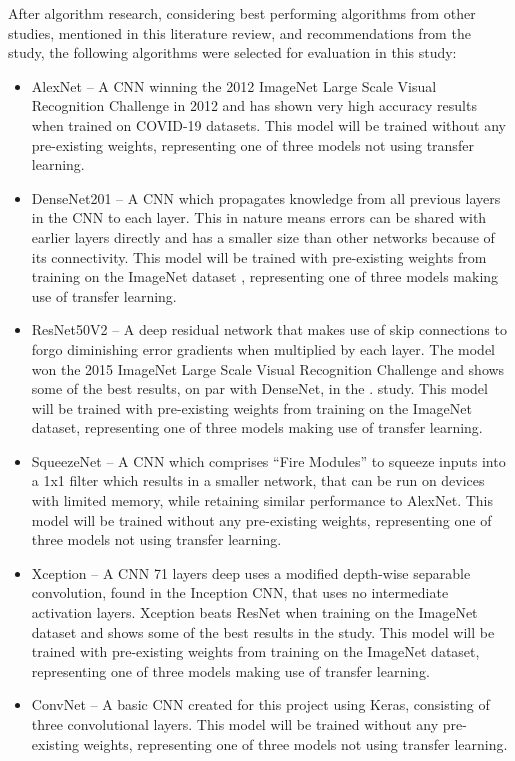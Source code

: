 After algorithm research, considering best performing algorithms from other studies, mentioned in this literature review, and recommendations from the \cite{roberts2021common} study, the following algorithms were selected for evaluation in this study:
\begin{itemize}
    \item AlexNet \citep{krizhevsky2012imagenet} – A CNN winning the 2012 ImageNet Large Scale Visual Recognition Challenge in 2012 and has shown very high accuracy results when trained on COVID-19 datasets. This model will be trained without any pre-existing weights, representing one of three models not using transfer learning.
    
    \item DenseNet201 \citep{huang2017densely} – A CNN which propagates knowledge from all previous layers in the CNN to each layer. This in nature means errors can be shared with earlier layers directly and has a smaller size than other networks because of its connectivity. This model will be trained with pre-existing weights from training on the ImageNet dataset \citep{deng2009imagenet}, representing one of three models making use of transfer learning.
    
    \item ResNet50V2 \citep{he2016identity} – A deep residual network that makes use of skip connections to forgo diminishing error gradients when multiplied by each layer. The model won the 2015 ImageNet Large Scale Visual Recognition Challenge and shows some of the best results, on par with DenseNet, in the \cite{bressem2020comparing}. study. This model will be trained with pre-existing weights from training on the ImageNet dataset, representing one of three models making use of transfer learning.
    
    \item SqueezeNet \citep{iandola2016squeezenet} – A CNN which comprises “Fire Modules” to squeeze inputs into a 1x1 filter which results in a smaller network, that can be run on devices with limited memory, while retaining similar performance to AlexNet. This model will be trained without any pre-existing weights, representing one of three models not using transfer learning.
    
    \item Xception \citep{chollet2017xception} – A CNN 71 layers deep uses a modified depth-wise separable convolution, found in the Inception CNN, that uses no intermediate activation layers. Xception beats ResNet when training on the ImageNet dataset and shows some of the best results in the \citep{bressem2020comparing} study. This model will be trained with pre-existing weights from training on the ImageNet dataset, representing one of three models making use of transfer learning.
    
    \item ConvNet – A basic CNN created for this project using Keras, consisting of three convolutional layers. This model will be trained without any pre-existing weights, representing one of three models not using transfer learning.
\end{itemize}